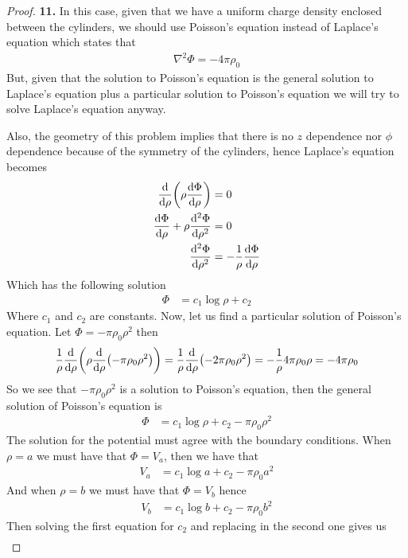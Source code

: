 \documentclass[11pt]{article}
\theoremstyle{definition}
\begin{document}
\cleardoublepage
\begin{proof}{\textbf{11.}}
In this case, given that we have a uniform charge density enclosed between the
cylinders, we should use Poisson's equation instead of Laplace's equation
which states that
\begin{align*}
    \nabla^2 \Phi = -4\pi\rho_0
\end{align*}
But, given that the solution to Poisson's equation is the general solution
to Laplace's equation plus a particular solution to Poisson's equation we
will try to solve Laplace's equation anyway.

Also, the geometry of this problem implies that there is no $z$ dependence
nor $\phi$ dependence because of the symmetry of the cylinders, hence
Laplace's equation becomes
\begin{align*}
    \dv{\rho}(\rho\dv{\Phi}{\rho}) &= 0\\
    \dv{\Phi}{\rho} + \rho\dv[2]{\Phi}{\rho} &= 0\\
    \dv[2]{\Phi}{\rho} &= -\frac{1}{\rho}\dv{\Phi}{\rho}
\end{align*}
Which has the following solution
\begin{align*}
    \Phi &= c_1 \log\rho + c_2
\end{align*}
Where $c_1$ and $c_2$ are constants.
Now, let us find a particular solution of Poisson's equation.
Let $\Phi = -\pi\rho_0\rho^2$ then
\begin{align*}
    \frac{1}{\rho}\dv{\rho}(\rho\dv{\rho}(-\pi\rho_0\rho^2))
    = \frac{1}{\rho}\dv{\rho}(-2\pi\rho_0\rho^2)
    = -\frac{1}{\rho}4\pi\rho_0\rho
    = -4\pi\rho_0
\end{align*}
So we see that $-\pi\rho_0\rho^2$ is a solution to Poisson's equation, then
the general solution of Poisson's equation is
\begin{align*}
    \Phi &= c_1 \log\rho + c_2 - \pi\rho_0\rho^2
\end{align*}
The solution for the potential must agree with the boundary conditions.
When $\rho = a$ we must have that $\Phi = V_a$, then we have that
\begin{align*}
    V_a &= c_1 \log a + c_2 - \pi\rho_0 a^2
\end{align*}
And when $\rho = b$ we must have that $\Phi = V_b$ hence
\begin{align*}
    V_b &= c_1 \log b + c_2 - \pi\rho_0b^2
\end{align*}
Then solving the first equation for $c_2$ and replacing in the second one gives
us
\begin{align*}

\end{align*}
\end{proof}
\end{document}
